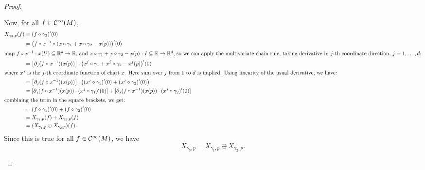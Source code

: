 \begin{proof}
\begin{enumerate}
              Now, for all \(f \in \mathcal C^\infty(M)\),
              \begin{align*}
                  X_{\gamma_3, p}(f) & = (f \circ \gamma_3)'(0)                                                                                                                  \\
                                     & = \qty(f \circ x^{-1} \circ (x \circ \gamma_1 + x \circ \gamma_2 - x(p)))'(0)                                                             \\
                  \intertext{map \(f \circ x^{-1}: x(U) \subseteq \mathbb R^d \to \mathbb R\), and \(x \circ \gamma_1 + x \circ \gamma_2 - x(p): I \subseteq \mathbb R\to \mathbb R^d\), so we can apply the multivariate chain rule, taking derivative in \(j\)-th coordinate direction, \(j = 1, \ldots, d\):}
                                     & = \qty[\partial_j (f \circ x^{-1})(x(p))] \cdot \qty(x^j \circ \gamma_1 + x^j \circ \gamma_2 - x^j(p))'(0)                                \\
                  \shortintertext{where \(x^j\) is the \(j\)-th coordinate function of chart \(x\). Here sum over \(j\) from \(1\) to \(d\) is implied. Using linearity of the usual derivative, we have:}
                                     & = \qty[\partial_j (f \circ x^{-1})(x(p))] \cdot \qty((x^j \circ \gamma_1)'(0) + (x^j \circ \gamma_2)'(0))                                 \\
                                     & = [\partial_j (f \circ x^{-1})(x(p)) \cdot (x^j \circ \gamma_1)'(0)] + [\partial_j (f \circ x^{-1})(x(p)) \cdot (x^j \circ \gamma_2)'(0)] \\
                  \shortintertext{combining the term in the square brackets, we get:}
                                     & = (f \circ \gamma_1)'(0) + (f \circ \gamma_2)'(0)                                                                                         \\
                                     & = X_{\gamma_1, p}(f) + X_{\gamma_2, p}(f)                                                                                                 \\
                                     & = (X_{\gamma_1, p} \oplus X_{\gamma_2, p})(f).
              \end{align*}
              Since this is true for all \(f \in \mathcal C^\infty(M)\), we have
              \begin{equation}
                  X_{\gamma_3, p} = X_{\gamma_1, p} \oplus X_{\gamma_2, p}.
              \end{equation}


\end{enumerate}
\end{proof}
